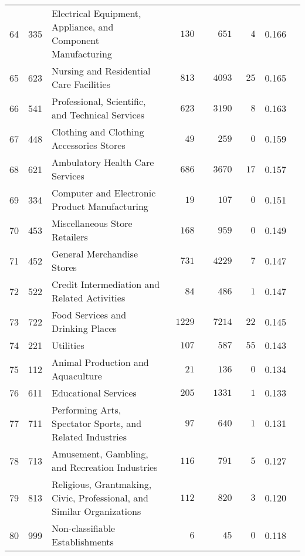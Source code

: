 \documentclass[9pt, oneside]{article}   	%
\begin{document}
\begin{longtable}{lcp{3 in}ccccc}
64  & 335 & Electrical Equipment, Appliance, and Component Manufacturing & $\phantom{00}130$ & $\phantom{000}651$ & $\phantom{00}4$ & 0.166 \\
65  & 623 & Nursing and Residential Care Facilities & $\phantom{00}813$ & $\phantom{00}4093$ & $\phantom{0}25$ & 0.165 \\
66  & 541 & Professional, Scientific, and Technical Services & $\phantom{00}623$ & $\phantom{00}3190$ & $\phantom{00}8$ & 0.163 \\
67  & 448 & Clothing and Clothing Accessories Stores & $\phantom{000}49$ & $\phantom{000}259$ & $\phantom{00}0$ & 0.159 \\
68  & 621 & Ambulatory Health Care Services & $\phantom{00}686$ & $\phantom{00}3670$ & $\phantom{0}17$ & 0.157 \\
69  & 334 & Computer and Electronic Product Manufacturing & $\phantom{000}19$ & $\phantom{000}107$ & $\phantom{00}0$ & 0.151 \\
70  & 453 & Miscellaneous Store Retailers & $\phantom{00}168$ & $\phantom{000}959$ & $\phantom{00}0$ & 0.149 \\
71  & 452 & General Merchandise Stores & $\phantom{00}731$ & $\phantom{00}4229$ & $\phantom{00}7$ & 0.147 \\
72  & 522 & Credit Intermediation and Related Activities & $\phantom{000}84$ & $\phantom{000}486$ & $\phantom{00}1$ & 0.147 \\
73  & 722 & Food Services and Drinking Places & $\phantom{0}1229$ & $\phantom{00}7214$ & $\phantom{0}22$ & 0.145 \\
74  & 221 & Utilities & $\phantom{00}107$ & $\phantom{000}587$ & $\phantom{0}55$ & 0.143 \\
75  & 112 & Animal Production and Aquaculture & $\phantom{000}21$ & $\phantom{000}136$ & $\phantom{00}0$ & 0.134 \\
76  & 611 & Educational Services & $\phantom{00}205$ & $\phantom{00}1331$ & $\phantom{00}1$ & 0.133 \\
77  & 711 & Performing Arts, Spectator Sports, and Related Industries & $\phantom{000}97$ & $\phantom{000}640$ & $\phantom{00}1$ & 0.131 \\
78  & 713 & Amusement, Gambling, and Recreation Industries & $\phantom{00}116$ & $\phantom{000}791$ & $\phantom{00}5$ & 0.127 \\
79  & 813 & Religious, Grantmaking, Civic, Professional, and Similar Organizations & $\phantom{00}112$ & $\phantom{000}820$ & $\phantom{00}3$ & 0.120 \\
80  & 999 & Non-classifiable Establishments & $\phantom{0000}6$ & $\phantom{0000}45$ & $\phantom{00}0$ & 0.118 \\

\end{longtable}
\end{document}
